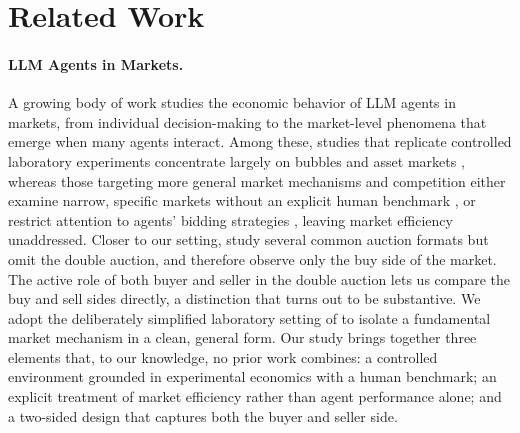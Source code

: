 \documentclass[letterpaper]{article} %
\begin{document}
\section{Related Work}

\paragraph{LLM Agents in Markets.} A growing body of work studies the economic behavior of LLM agents in
markets, from individual decision-making to the market-level phenomena that emerge when many agents interact. Among these, studies that replicate controlled laboratory experiments concentrate largely on bubbles
and asset markets \citep{saxena2026machinespiritsspeculationadaptation,
rio-chanonaCanGenerativeAI2025, henningLLMAgentsNot2025}, whereas those targeting more general market mechanisms and competition either examine
narrow, specific markets without an explicit human benchmark
\citep{zhaoCompeteAIUnderstandingCompetition2024a}, or restrict attention to
agents' bidding strategies \citep{chenPutYourMoney2024}, leaving market efficiency unaddressed. Closer to our setting,
\citet{shahLearningSyntheticLabs2025} study several common auction formats but omit the double auction, and therefore observe only the buy side of the market. The active role of both buyer and seller in the double auction lets us compare the
buy and sell sides directly, a distinction that turns out to be substantive. We adopt the deliberately simplified laboratory setting of
\citet{smithExperimentalStudyCompetitive1962} to isolate a fundamental market mechanism in a clean, general form. Our study brings together three elements
that, to our knowledge, no prior work combines: a controlled environment grounded in experimental economics with a human benchmark; an explicit treatment of market efficiency rather than agent performance alone; and a two-sided design that captures both the buyer and seller side.
\end{document}
